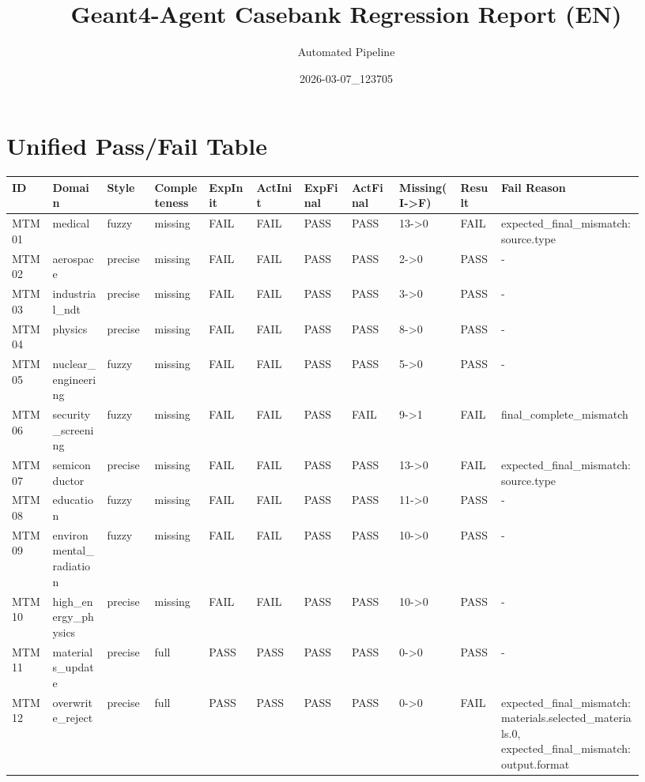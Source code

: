 \documentclass[11pt]{ctexart}
\title{Geant4-Agent Casebank Regression Report (EN)}
\author{Automated Pipeline}
\date{2026-03-07\_123705}
\begin{document}
\maketitle
\section{Unified Pass/Fail Table}
\begin{longtable}{p{0.06\linewidth}p{0.08\linewidth}p{0.07\linewidth}p{0.08\linewidth}p{0.07\linewidth}p{0.07\linewidth}p{0.07\linewidth}p{0.07\linewidth}p{0.09\linewidth}p{0.06\linewidth}p{0.21\linewidth}}
\toprule
ID & Domain & Style & Completeness & ExpInit & ActInit & ExpFinal & ActFinal & Missing(I->F) & Result & Fail Reason \\
\midrule
MTM01 & medical & fuzzy & missing & FAIL & FAIL & PASS & PASS & 13->0 & FAIL & expected\_final\_mismatch:source.type \\
MTM02 & aerospace & precise & missing & FAIL & FAIL & PASS & PASS & 2->0 & PASS & - \\
MTM03 & industrial\_ndt & precise & missing & FAIL & FAIL & PASS & PASS & 3->0 & PASS & - \\
MTM04 & physics & precise & missing & FAIL & FAIL & PASS & PASS & 8->0 & PASS & - \\
MTM05 & nuclear\_engineering & fuzzy & missing & FAIL & FAIL & PASS & PASS & 5->0 & PASS & - \\
MTM06 & security\_screening & fuzzy & missing & FAIL & FAIL & PASS & FAIL & 9->1 & FAIL & final\_complete\_mismatch \\
MTM07 & semiconductor & precise & missing & FAIL & FAIL & PASS & PASS & 13->0 & FAIL & expected\_final\_mismatch:source.type \\
MTM08 & education & fuzzy & missing & FAIL & FAIL & PASS & PASS & 11->0 & PASS & - \\
MTM09 & environmental\_radiation & fuzzy & missing & FAIL & FAIL & PASS & PASS & 10->0 & PASS & - \\
MTM10 & high\_energy\_physics & precise & missing & FAIL & FAIL & PASS & PASS & 10->0 & PASS & - \\
MTM11 & materials\_update & precise & full & PASS & PASS & PASS & PASS & 0->0 & PASS & - \\
MTM12 & overwrite\_reject & precise & full & PASS & PASS & PASS & PASS & 0->0 & FAIL & expected\_final\_mismatch:materials.selected\_materials.0, expected\_final\_mismatch:output.format \\
\bottomrule
\end{longtable}
\end{document}
